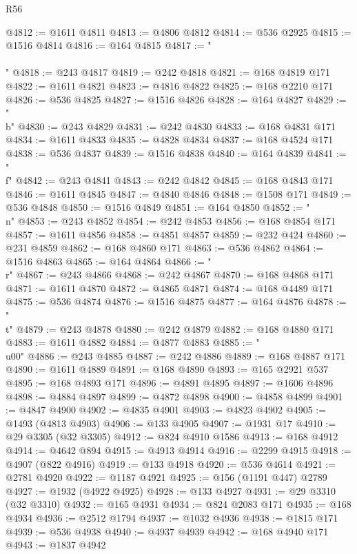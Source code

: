 \begin{lexlean}{R56}
\begin{coremodule}
{{{{{{{{{{{{{{{{{{{{{{{{{{{{{{{{{{{{{{{{{{{{{{{{{{{{{{{{{{{{{{{{{{{{{{{{{{{{{{{{{{{{{{{{{{{{{{{{{{{{{{{{{{{{{{{{{{{{{{{{{{{{{{{{{{{{{{{{{{{{{{{{{{{{{{{{{{{{{{{{{{{{{{{{{{{{{{{{{{{{{{{{{{{{{{{{{{{{{{{{{{{{{{{{{{{@4812 := @1611 @4811
@4813 := @4806 @4812
@4814 := @536 @2925
@4815 := @1516 @4814
@4816 := @164 @4815
@4817 := "\\\\"
@4818 := @243 @4817
@4819 := @242 @4818
@4821 := @168 @4819 @171
@4822 := @1611 @4821
@4823 := @4816 @4822
@4825 := @168 @2210 @171
@4826 := @536 @4825
@4827 := @1516 @4826
@4828 := @164 @4827
@4829 := "\\b"
@4830 := @243 @4829
@4831 := @242 @4830
@4833 := @168 @4831 @171
@4834 := @1611 @4833
@4835 := @4828 @4834
@4837 := @168 @4524 @171
@4838 := @536 @4837
@4839 := @1516 @4838
@4840 := @164 @4839
@4841 := "\\f"
@4842 := @243 @4841
@4843 := @242 @4842
@4845 := @168 @4843 @171
@4846 := @1611 @4845
@4847 := @4840 @4846
@4848 := @1508 @171
@4849 := @536 @4848
@4850 := @1516 @4849
@4851 := @164 @4850
@4852 := "\\n"
@4853 := @243 @4852
@4854 := @242 @4853
@4856 := @168 @4854 @171
@4857 := @1611 @4856
@4858 := @4851 @4857
@4859 := @232 @424
@4860 := @231 @4859
@4862 := @168 @4860 @171
@4863 := @536 @4862
@4864 := @1516 @4863
@4865 := @164 @4864
@4866 := "\\r"
@4867 := @243 @4866
@4868 := @242 @4867
@4870 := @168 @4868 @171
@4871 := @1611 @4870
@4872 := @4865 @4871
@4874 := @168 @4489 @171
@4875 := @536 @4874
@4876 := @1516 @4875
@4877 := @164 @4876
@4878 := "\\t"
@4879 := @243 @4878
@4880 := @242 @4879
@4882 := @168 @4880 @171
@4883 := @1611 @4882
@4884 := @4877 @4883
@4885 := "\\u00"
@4886 := @243 @4885
@4887 := @242 @4886
@4889 := @168 @4887 @171
@4890 := @1611 @4889
@4891 := @168 @4890
@4893 := @165 @2921 @537
@4895 := @168 @4893 @171
@4896 := @4891 @4895
@4897 := @1606 @4896
@4898 := @4884 @4897
@4899 := @4872 @4898
@4900 := @4858 @4899
@4901 := @4847 @4900
@4902 := @4835 @4901
@4903 := @4823 @4902
@4905 := @1493 (@4813 @4903)
@4906 := @133 @4905
@4907 := @1931 @17
@4910 := @29 @3305 (@32 @3305)
@4912 := @824 @4910 @1586
@4913 := @168 @4912
@4914 := @4642 @894
@4915 := @4913 @4914
@4916 := @2299 @4915
@4918 := @4907 (@822 @4916)
@4919 := @133 @4918
@4920 := @536 @4614
@4921 := @2781 @4920
@4922 := @1187 @4921
@4925 := @156 (@1191 @447) @2789
@4927 := @1932 (@4922 @4925)
@4928 := @133 @4927
@4931 := @29 @3310 (@32 @3310)
@4932 := @165 @4931
@4934 := @824 @2083 @171
@4935 := @168 @4934
@4936 := @2512 @1794
@4937 := @1032 @4936
@4938 := @1815 @171
@4939 := @536 @4938
@4940 := @4937 @4939
@4942 := @168 @4940 @171
@4943 := @1837 @4942
}}}}}}}}}}}}}}}}}}}}}}}}}}}}}}}}}}}}}}}}}}}}}}}}}}}}}}}}}}}}}}}}}}}}}}}}}}}}}}}}}}}}}}}}}}}}}}}}}}}}}}}}}}}}}}}}}}}}}}}}}}}}}}}}}}}}}}}}}}}}}}}}}}}}}}}}}}}}}}}}}}}}}}}}}}}}}}}}}}}}}}}}}}}}}}}}}}}}}}}}}}}}}}}}}}}
\end{coremodule}
\end{lexlean}
